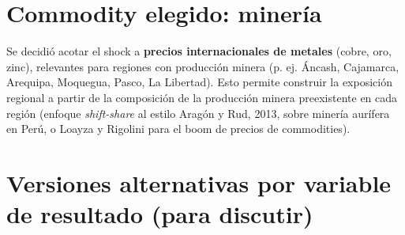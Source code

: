 \documentclass[11pt]{article}
\begin{document}
\section{Commodity elegido: minería}
Se decidió acotar el shock a \textbf{precios internacionales de metales} (cobre, oro, zinc),
relevantes para regiones con producción minera (p. ej. Áncash, Cajamarca, Arequipa, Moquegua,
Pasco, La Libertad). Esto permite construir la exposición regional a partir de la
composición de la producción minera preexistente en cada región (enfoque \textit{shift-share}
al estilo Aragón y Rud, 2013, sobre minería aurífera en Perú, o Loayza y Rigolini para el
boom de precios de commodities).

\section{Versiones alternativas por variable de resultado (para discutir)}
\end{document}
